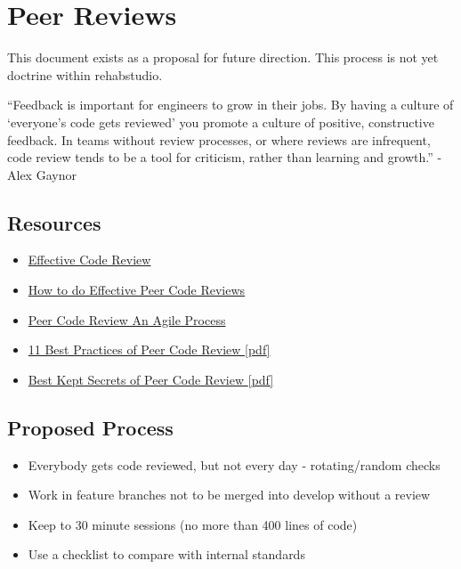 \documentclass[letterpaper,10pt,english]{sphinxmanual}
\begin{document}
\chapter{Peer Reviews}
\label{peer_reviews:peer-reviews}\label{peer_reviews::doc}
This document exists as a proposal for future direction.  This process is not yet doctrine within rehabstudio.

“Feedback is important for engineers to grow in their jobs. By having a culture of ‘everyone’s code gets reviewed’ you promote a culture of positive, constructive feedback. In teams without review processes, or where reviews are infrequent, code review tends to be a tool for criticism, rather than learning and growth.”
- Alex Gaynor


\section{Resources}
\label{peer_reviews:resources}\begin{itemize}
\item {} 
\href{http://alexgaynor.net/2013/sep/26/effective-code-review/}{Effective Code Review}

\item {} 
\href{http://news.dice.com/2012/10/30/how-to-do-effective-peer-code-reviews/}{How to do Effective Peer Code Reviews}

\item {} 
\href{http://www.slideshare.net/gsporar/peer-code-review-an-agile-process-2502327}{Peer Code Review An Agile Process}

\item {} 
\href{http://smartbear.com/SmartBear/media/pdfs/WP-CC-11-Best-Practices-of-Peer-Code-Review.pdf}{11 Best Practices of Peer Code Review {[}pdf{]}}

\item {} 
\href{http://smartbear.com/SmartBear/media/pdfs/best-kept-secrets-of-peer-code-review.pdf}{Best Kept Secrets of Peer Code Review {[}pdf{]}}

\end{itemize}


\section{Proposed Process}
\label{peer_reviews:proposed-process}\begin{itemize}
\item {} 
Everybody gets code reviewed, but not every day - rotating/random checks

\item {} 
Work in feature branches not to be merged into develop without a review

\item {} 
Keep to 30 minute sessions (no more than 400 lines of code)

\item {} 
Use a checklist to compare with internal standards

\end{itemize}
\end{document}
